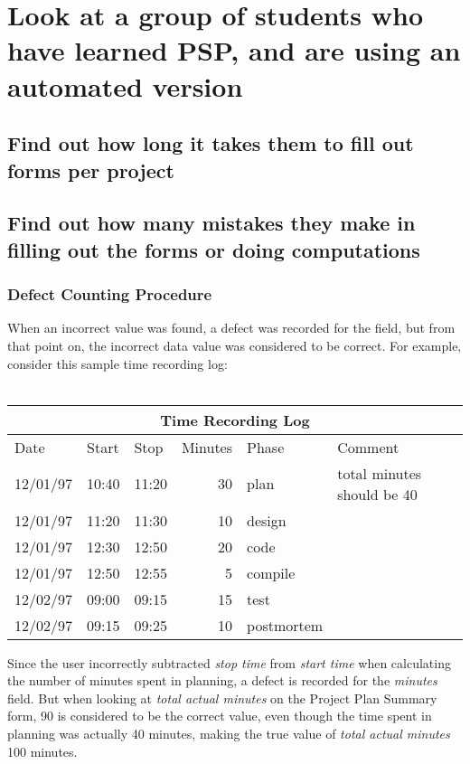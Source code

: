 \section{Look at a group of students who have learned PSP, and are using an automated version}
\subsection{Find out how long it takes them to fill out forms per project}
\subsection{Find out how many mistakes they make in filling out the forms
or doing computations}
\subsubsection{Defect Counting Procedure}

When an incorrect value was found, a defect was recorded for the field,
but from that point on, the incorrect data value was considered to be 
correct.  For example, consider this sample time recording log: \\ \\

\begin{center}
\begin{tabular}{|l|l|l|r|l|l|}\hline
\multicolumn{6}{|c|}{\bf Time Recording Log}\\ \hline
Date & Start & Stop & Minutes & Phase & Comment \\ \hline\hline
12/01/97 & 10:40 & 11:20 & 30 & plan       & total minutes should be 40 \\ \hline
12/01/97 & 11:20 & 11:30 & 10 & design     & \\ \hline
12/01/97 & 12:30 & 12:50 & 20 & code       & \\ \hline
12/01/97 & 12:50 & 12:55 &  5 & compile    & \\ \hline
12/02/97 & 09:00 & 09:15 & 15 & test       & \\ \hline
12/02/97 & 09:15 & 09:25 & 10 & postmortem & \\ \hline 
\end{tabular}
\end{center}

Since the user incorrectly subtracted {\it stop time} from {\it start time}
when calculating the number of minutes spent in planning, a defect
is recorded for the {\it minutes} field.  But when looking at {\it total actual
minutes} on the Project Plan Summary form, 90 is considered to be the
correct value, even though the time spent in planning was
actually 40 minutes, making the true value of {\it total actual minutes}
100 minutes.

